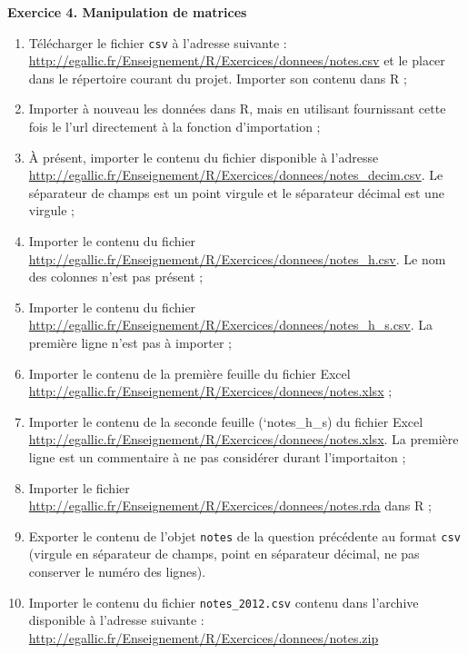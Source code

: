 \documentclass[
  11pt,
]{book}
\makeatletter
\providecommand{\tightlist}{%
  \setlength{\itemsep}{0pt}\setlength{\parskip}{0pt}}
\numberwithin{equation}{section}
\numberwithin{countremarque}{section}
\newenvironment{exframe}{%
 \def\at@end@of@exframe{}%
 \ifinner\ifhmode%
  \def\at@end@of@exframe{\end{minipage}}%
  \begin{minipage}{\columnwidth}%
 \fi\fi%
 \def\FrameCommand##1{\hskip\@totalleftmargin \hskip-\fboxsep
 \colorbox{shadecolorex}{##1}\hskip-\fboxsep
     \hskip-\linewidth \hskip-\@totalleftmargin \hskip\columnwidth}%
 \MakeFramed {\advance\hsize-\width
   \@totalleftmargin\z@ \linewidth\hsize
   \@setminipage}}%
 {\par\unskip\endMakeFramed%
 \at@end@of@exframe}
\makeatother
\begin{document}
\begin{exframe}
\textbf{Exercice 4. Manipulation de matrices}

\begin{enumerate}
\def\labelenumi{\arabic{enumi}.}
\tightlist
\item
  Télécharger le fichier \texttt{csv} à l'adresse suivante : \url{http://egallic.fr/Enseignement/R/Exercices/donnees/notes.csv} et le placer dans le répertoire courant du projet. Importer son contenu dans R ;
\item
  Importer à nouveau les données dans R, mais en utilisant fournissant cette fois le l'url directement à la fonction d'importation ;
\item
  À présent, importer le contenu du fichier disponible à l'adresse \url{http://egallic.fr/Enseignement/R/Exercices/donnees/notes_decim.csv}. Le séparateur de champs est un point virgule et le séparateur décimal est une virgule ;
\item
  Importer le contenu du fichier \url{http://egallic.fr/Enseignement/R/Exercices/donnees/notes_h.csv}. Le nom des colonnes n'est pas présent ;
\item
  Importer le contenu du fichier \url{http://egallic.fr/Enseignement/R/Exercices/donnees/notes_h_s.csv}. La première ligne n'est pas à importer ;
\item
  Importer le contenu de la première feuille du fichier Excel \url{http://egallic.fr/Enseignement/R/Exercices/donnees/notes.xlsx} ;
\item
  Importer le contenu de la seconde feuille (`notes\_h\_s) du fichier Excel \url{http://egallic.fr/Enseignement/R/Exercices/donnees/notes.xlsx}. La première ligne est un commentaire à ne pas considérer durant l'importaiton ;
\item
  Importer le fichier \url{http://egallic.fr/Enseignement/R/Exercices/donnees/notes.rda} dans R ;
\item
  Exporter le contenu de l'objet \texttt{notes} de la question précédente au format \texttt{csv} (virgule en séparateur de champs, point en séparateur décimal, ne pas conserver le numéro des lignes).
\item
  Importer le contenu du fichier \texttt{notes\_2012.csv} contenu dans l'archive disponible à l'adresse suivante : \url{http://egallic.fr/Enseignement/R/Exercices/donnees/notes.zip}
\end{enumerate}
\end{exframe}
\end{document}
